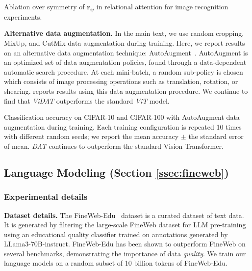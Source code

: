 \begin{table}
    \resizebox{\textwidth}{!}{
    
    }
    \vskip5pt
    \caption{Ablation over symmetry of $\bm{r}_{ij}$ in relational attention for image recognition experiments.}\label{tab:cifar_results_symmetry_ablation}
\end{table}

\textbf{Alternative data augmentation.} In the main text, we use random cropping, MixUp, and CutMix data augmentation during training. Here, we report results on an alternative data augmentation technique: AutoAugment~\citep{cubuk2019autoaugmentlearningaugmentationpolicies}. AutoAugment is an optimized set of data augmentation policies, found through a data-dependent automatic search procedure. At each mini-batch, a random sub-policy is chosen which consists of image processing operations such as translation, rotation, or shearing.  reports results using this data augmentation procedure. We continue to find that \textit{ViDAT} outperforms the standard \textit{ViT} model.

\begin{table}
    
    \vskip5pt
    \caption{Classification accuracy on CIFAR-10 and CIFAR-100 with AutoAugment data augmentation during training. Each training configuration is repeated 10 times with different random seeds; we report the mean accuracy $\pm$ the standard error of mean. \textit{DAT} continues to outperform the standard Vision Transformer.}\label{tab:cifar_results_autoaugment}
\end{table}

\subsection{Language Modeling (Section \ref{ssec:fineweb})}\label{ssec:appendix_fineweb}

\subsubsection*{Experimental details}

\textbf{Dataset details.} The FineWeb-Edu~\citep{lozhkov2024fineweb-edu} dataset is a curated dataset of text data. It is generated by filtering the large-scale FineWeb dataset for LLM pre-training~\citep{penedo2024finewebdatasetsdecantingweb} using an educational quality classifier trained on annotations generated by LLama3-70B-instruct. FineWeb-Edu has been shown to outperform FineWeb on several benchmarks, demonstrating the importance of data \textit{quality}. We train our language models on a random subset of 10 billion tokens of FineWeb-Edu.

